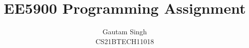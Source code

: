 \documentclass[journal,12pt,twocolumn]{IEEEtran}
\DeclareMathOperator*{\Res}{Res}
\begin{document}
\newtheorem{theorem}{Theorem}[section]
\newtheorem{problem}{Problem}
\newtheorem{proposition}{Proposition}[section]
\newtheorem{lemma}{Lemma}[section]
\newtheorem{corollary}[theorem]{Corollary}
\newtheorem{example}{Example}[section]
\newtheorem{definition}[problem]{Definition}
\newcommand{\BEQA}{\begin{eqnarray}}
\newcommand{\EEQA}{\end{eqnarray}}
\newcommand{\define}{\stackrel{\triangle}{=}}

\providecommand{\mbf}{\mathbf}
\providecommand{\pr}[1]{\ensuremath{\Pr\left(#1\right)}}
\providecommand{\qfunc}[1]{\ensuremath{Q\left(#1\right)}}
\providecommand{\sbrak}[1]{\ensuremath{{}\left[#1\right]}}
\providecommand{\lsbrak}[1]{\ensuremath{{}\left[#1\right.}}
\providecommand{\rsbrak}[1]{\ensuremath{{}\left.#1\right]}}
\providecommand{\brak}[1]{\ensuremath{\left(#1\right)}}
\providecommand{\lbrak}[1]{\ensuremath{\left(#1\right.}}
\providecommand{\rbrak}[1]{\ensuremath{\left.#1\right)}}
\providecommand{\cbrak}[1]{\ensuremath{\left\{#1\right\}}}
\providecommand{\lcbrak}[1]{\ensuremath{\left\{#1\right.}}
\providecommand{\rcbrak}[1]{\ensuremath{\left.#1\right\}}}
\theoremstyle{remark}
\newtheorem{rem}{Remark}
\newcommand{\sgn}{\mathop{\mathrm{sgn}}}
\providecommand{\abs}[1]{\left\vert#1\right\vert}
\providecommand{\res}[1]{\Res\displaylimits_{#1}} 
\providecommand{\norm}[1]{\left\lVert#1\right\rVert}
\providecommand{\mtx}[1]{\mathbf{#1}}
\providecommand{\mean}[1]{E\left[ #1 \right]}   
\providecommand{\fourier}{\overset{\mathcal{F}}{ \rightleftharpoons}}
\providecommand{\system}[1]{\overset{\mathcal{#1}}{ \longleftrightarrow}}
\newcommand{\solution}{\noindent \textbf{Solution: }}
\newcommand{\cosec}{\,\text{cosec}\,}
\providecommand{\dec}[2]{\ensuremath{\overset{#1}{\underset{#2}{\gtrless}}}}
\newcommand{\myvec}[1]{\ensuremath{\begin{pmatrix}#1\end{pmatrix}}}
\newcommand{\mydet}[1]{\ensuremath{\begin{vmatrix}#1\end{vmatrix}}}
\renewcommand{\vec}[1]{\boldsymbol{\mathbf{#1}}}
\def\putbox#1#2#3{\makebox[0in][l]{\makebox[#1][l]{}\raisebox{\baselineskip}[0in][0in]{\raisebox{#2}[0in][0in]{#3}}}}
     \def\rightbox#1{\makebox[0in][r]{#1}}
     \def\centbox#1{\makebox[0in]{#1}}
     \def\topbox#1{\raisebox{-\baselineskip}[0in][0in]{#1}}
     \def\midbox#1{\raisebox{-0.5\baselineskip}[0in][0in]{#1}}

\vspace{3cm}
\title{EE5900 Programming Assignment }
\author{Gautam Singh\\CS21BTECH11018}
\maketitle
\tableofcontents
\bigskip
\end{document}
